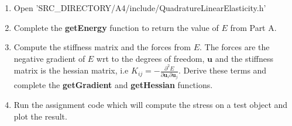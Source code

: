 \documentclass[11pt]{article}
\begin{document}
\begin{enumerate}
    \item Open '{SRC\_DIRECTORY}/A4/include/QuadratureLinearElasticity.h'
    \item Complete the \textbf{getEnergy} function to return the value of $E$ from Part A.
    \item Compute the stiffness matrix and the forces from $E$. The forces are the negative gradient of $E$ wrt to
    the degrees of freedom, $\mathbf{u}$ and the stiffness matrix is the hessian matrix, i.e $K_{ij} = - \frac{\partial^2 E}{\partial \mathbf{u}_i \partial \mathbf{u}_j}$. Derive these terms and complete the \textbf{getGradient} and \textbf{getHessian} functions.
    \item Run the assignment code which will compute the stress on a test object and plot the result.
\end{enumerate}
\end{document}
